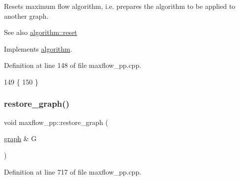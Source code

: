 Resets maximum flow algorithm, i.\+e. prepares the algorithm to be applied to another graph. \begin{DoxySeeAlso}{See also}
\mbox{\hyperlink{classalgorithm_a21aba63d066ae7897de6ca7d8425c408}{algorithm\+::reset}} 
\end{DoxySeeAlso}


Implements \mbox{\hyperlink{classalgorithm_a21aba63d066ae7897de6ca7d8425c408}{algorithm}}.



Definition at line 148 of file maxflow\+\_\+pp.\+cpp.


\begin{DoxyCode}
149 \{
150 \}
\end{DoxyCode}
\mbox{\label{classmaxflow__pp_a273cc9bde3aeb47c08223da7458ed29d}} 
\subsubsection{\texorpdfstring{restore\+\_\+graph()}{restore\_graph()}}
{\footnotesize\ttfamily void maxflow\+\_\+pp\+::restore\+\_\+graph (\begin{DoxyParamCaption}\item[{\mbox{\hyperlink{classgraph}{graph}} \&}]{G }\end{DoxyParamCaption})\hspace{0.3cm}{\ttfamily [protected]}}



Definition at line 717 of file maxflow\+\_\+pp.\+cpp.


